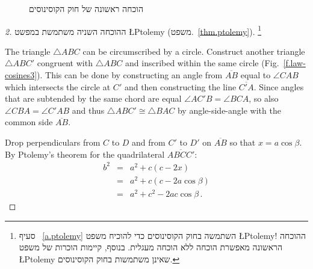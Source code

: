 \begin{figure}[b]
\begin{center}
\caption{הוכחה ראשונה של חוק הקוסינוסים}\label{f.law-cosines2}
\end{center}
\end{figure}

\begin{proof}[2]
ההוכחה השניה משתמשת במפשט
\L{Ptolemy}
(משפט.~\ref{thm.ptolemy}).%
\footnote{%
סעיף 
~\ref{a.ptolemy}
השתמשה בחוק הקוסינוסים כדי להוכיח משפט
\L{Ptolemy}!
ההוכחה הראשונה מאפשרת הוכחה ללא הוכחה מעגלית. בנוסף, קיימות הוכרות של משפט
\L{Ptolemy}
שאינן משתמשות בחוק הקוסינוסים.}

The triangle $\triangle ABC$ can be circumscribed by a circle. 
Construct another triangle $\triangle ABC'$ congruent with $\triangle ABC$ and inscribed within the same circle (Fig.~\ref{f.law-cosines3}). This can be done by constructing an angle from $\overline{AB}$ equal to $\angle CAB$ which intersects the circle at $C'$ and then constructing the line $\overline{C'A}$.
Since angles that are subtended by the same chord are equal $\angle AC'B =\angle BCA$, so also $\angle CBA=\angle C'AB$ and thus $\triangle ABC'\cong\triangle BAC$ by angle-side-angle with the common side $\overline{AB}$.

Drop perpendiculars from $C$ to $D$ and from $C'$ to $D'$ on $\overline{AB}$ so that $x=a\cos \beta$. By Ptolemy's theorem for the quadrilateral $\overline{ABCC'}$:
\begin{eqnarray*}
b^2&=&a^2+c(c-2x)\\
&=& a^2 + c(c-2a\cos\beta)\\
&=&a^2+c^2-2ac\cos\beta\,.
\end{eqnarray*}
\end{proof}

